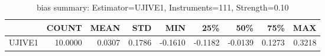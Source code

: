 \begin{table}[ht]
\centering
\caption{bias summary: Estimator=UJIVE1, Instruments=111, Strength=0.10}
\begin{tabular}{lrrrrrrrr}
\toprule
 & COUNT & MEAN & STD & MIN & 25\% & 50\% & 75\% & MAX \\
\midrule
UJIVE1 & 10.0000 & 0.0307 & 0.1786 & -0.1610 & -0.1182 & -0.0139 & 0.1273 & 0.3218 \\
\bottomrule
\end{tabular}
\end{table}
